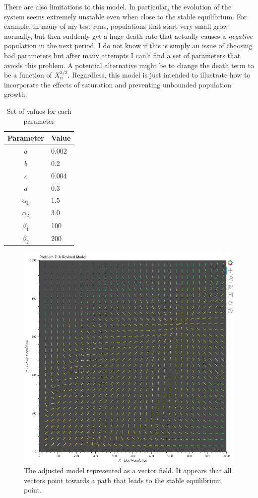 \documentclass[12pt,a4paper,titlepage]{report}
\begin{document}
		There are also limitations to this model. In particular, the evolution of the system seems extremely unstable even when close to the stable equilibrium. For example, in many of my test runs, populations that start very small grow normally, but then suddenly get a huge death rate that actually causes a \textit{negative} population in the next period. I do not know if this is simply an issue of choosing bad parameters but after many attempts I can't find a set of parameters that avoids this problem. A potential alternative might be to change the death term to be a function of \(X_n^{3/2}\). Regardless, this model is just intended to illustrate how to incorporate the effects of saturation and preventing unbounded population growth.
		\begin{table}[ht]
		\centering
		\begin{tabular}{cl}
			\toprule
				Parameter & Value \\ 
				\midrule 
				\(a\) & 0.002\\ 
				\(b\) & 0.2 \\
				\(c\) & 0.004  \\ 
				\(d\) & 0.3  \\
				\(\alpha_{1}\) & 1.5\\
				\(\alpha_{2}\) & 3.0\\
				\(\beta_{1}\) & 100 \\
				\(\beta_{2}\) & 200\\
				\bottomrule
			\end{tabular}
			\caption{Set of values for each parameter}
			\label{params2}
		\end{table}
		\begin{figure}[htbp]
		\centerline{\includegraphics[scale=.5]{charts/problem7_chart.png}}
		\caption{The adjusted model represented as a vector field. It appears that all vectors point towards a path that leads to the stable equilibrium point. }
		\label{fig:p7}
	\end{figure}\\
\end{document}
